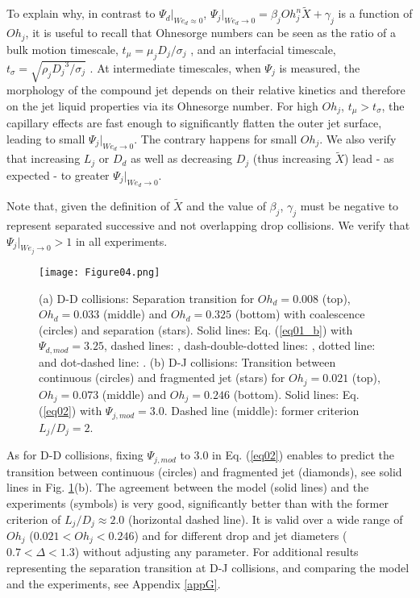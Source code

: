 \documentclass{article}
\begin{document}
 
 To explain why, in contrast to $\Psi_d|_{We_{d}\approx0}$, $\Psi_j|_{We_{d}\rightarrow0}=\beta_j Oh_j^n \tilde{X} + \gamma_j$  is a function of $Oh_j$, it is useful to recall that Ohnesorge numbers can be seen as the ratio of a bulk motion  timescale, $t_{\mu}=\mu_jD_j/\sigma_j$ \citep{stone}, and an interfacial timescale, $t_{\sigma}=\sqrt{\rho_j {D_j}^3/\sigma_j}$ \citep{ref:Rayleigh1892}. At intermediate timescales, when $\Psi_j$ is measured, the morphology of the compound jet depends on their relative kinetics and therefore on the jet liquid properties via its Ohnesorge number. For high $Oh_j$, $t_{\mu}>t_{\sigma}$, the capillary effects are fast enough to significantly flatten the outer jet surface, leading to small $\Psi_j|_{We_{d}\rightarrow0}$. The contrary happens for small $Oh_j$. We also verify that   increasing  $L_j$ or $D_d$ as well as decreasing $D_j$ (thus increasing $\tilde{X}$) lead - as expected - to  
 greater $\Psi_j|_{We_{d}\rightarrow0}$. 
 
Note that, given the definition of $\tilde{X}$ and the value of $\beta_j$, $\gamma_j$ must be negative to represent separated successive and not overlapping drop collisions. We verify that  $\Psi_j|_{We_{j}\rightarrow0}>1$ in all experiments.

\begin{figure}
\texttt{[image: Figure04.png]}
\centering
\caption{\label{fig04} (a) D-D collisions: Separation transition for $Oh_d=0.008$ (top), $Oh_d=0.033$ (middle) and $Oh_d=0.325$ (bottom) with coalescence (circles) and separation (stars). Solid lines: {Eq. (\ref{eq01_b}) with {$\Psi_{d, mod}=3.25$}}, dashed lines: \cite{ref:Jiang1992}, dash-double-dotted lines: \cite{ref:Finotello2017}, dotted line: \cite{ref:Ashgriz1990} and dot-dashed line: \cite{ref:Gotaas2007}. (b) D-J collisions: Transition between continuous (circles) and fragmented jet (stars) for $Oh_j=0.021$ (top), $Oh_j=0.073$ (middle) and $Oh_j=0.246$ (bottom). Solid lines:  Eq. (\ref{eq02}) with { $\Psi_{j, mod}=3.0$. }Dashed line (middle): former criterion $L_j/D_j=2$. }
\end{figure}

As for D-D collisions, fixing $\Psi_{j, mod}$ to 3.0 in Eq. (\ref{eq02}) enables to predict the transition between continuous (circles) and fragmented jet (diamonds), see solid lines in Fig. \ref{fig04}(b). The agreement between the model (solid lines) and the experiments (symbols) is very good, significantly better than with the former criterion of $L_j/D_j \approx 2.0$ (horizontal dashed line). It is valid over a wide range of $Oh_j$ ($0.021 < Oh_j < 0.246$) and for different drop and jet diameters ($0.7<\Delta<1.3$) without adjusting any parameter. For additional results representing the separation transition at D-J collisions, and comparing the model and the experiments, see Appendix \ref{appG}.    
\end{document}
